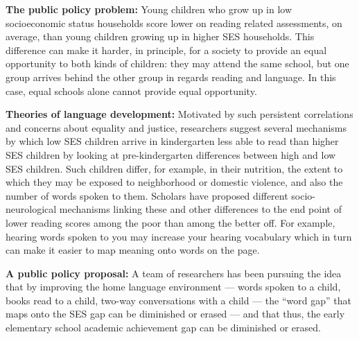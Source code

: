 \documentclass[
]{article}
\begin{document}
\textbf{The public policy problem:} Young children who grow up in low
socioeconomic status households score lower on reading related
assessments, on average, than young children growing up in higher SES
households. This difference can make it harder, in principle, for a
society to provide an equal opportunity to both kinds of children: they
may attend the same school, but one group arrives behind the other group
in regards reading and language. In this case, equal schools alone
cannot provide equal opportunity.

\textbf{Theories of language development:} Motivated by such persistent
correlations and concerns about equality and justice, researchers
suggest several mechanisms by which low SES children arrive in
kindergarten less able to read than higher SES children by looking at
pre-kindergarten differences between high and low SES children. Such
children differ, for example, in their nutrition, the extent to which
they may be exposed to neighborhood or domestic violence, and also the
number of words spoken to them. Scholars have proposed different
socio-neurological mechanisms linking these and other differences to the
end point of lower reading scores among the poor than among the better
off. For example, hearing words spoken to you may increase your hearing
vocabulary which in turn can make it easier to map meaning onto words on
the page.

\textbf{A public policy proposal:} A team of researchers has been
pursuing the idea that by improving the home language environment ---
words spoken to a child, books read to a child, two-way conversations
with a child --- the ``word gap'' that maps onto the SES gap can be
diminished or erased --- and that thus, the early elementary school
academic achievement gap can be diminished or erased.
\end{document}
